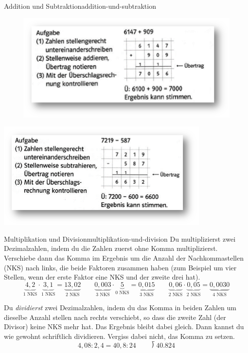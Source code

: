 \documentclass[12pt,a5paper,landscape]{scrartcl}
\begin{document}
	\begin{hilfekarte}{Addition und Subtraktion}{addition-und-subtraktion}
		\begin{figure}
			\includegraphics[height=.45\textheight]{6.2-LT-Abb_Addition}
		\end{figure}


		\includegraphics[height=.45\textheight]{6.2-LT-Abb_Subtraktion}
	\end{hilfekarte}

	\begin{hilfekarte}{Multiplikation und Division}{multiplikation-und-division}
		Du multiplizierst zwei Dezimalzahlen, indem du die Zahlen zuerst ohne Komma multiplizierst. Verschiebe dann das Komma im Ergebnis um die Anzahl der Nachkommastellen (NKS) nach links, die beide Faktoren zusammen haben (zum Beispiel um vier Stellen, wenn der erste Faktor eine NKS und der zweite drei hat).
		\[
		\underbrace{4,2}_{\text{1 NKS}}\cdot \underbrace{3,1}_{\text{1 NKS}} = \underbrace{13,02}_{\text{2 NKS}} \qquad
		\underbrace{0,003}_{\text{3 NKS}}\cdot \underbrace{5}_{\text{0 NKS}} = \underbrace{0,015}_{\text{3 NKS}} \qquad
		\underbrace{0,06}_{\text{2 NKS}}\cdot \underbrace{0,05}_{\text{2 NKS}} = \underbrace{0,0030}_{\text{4 NKS}}
		\]

		Du \emph{dividierst} zwei Dezimalzahlen, indem du das Komma in beiden Zahlen um dieselbe Anzahl stellen nach rechts verschiebt, so dass die zweite Zahl (der Divisor) keine NKS mehr hat. Das Ergebnis bleibt dabei gleich.
		Dann kannst du wie gewohnt schriftlich dividieren. Vergiss dabei nicht, das Komma zu setzen.
		\[ 4,08 : 2,4 = 40,8 : 24 \qquad \longdivision{40.8}{24} \]
	\end{hilfekarte}
\end{document}
